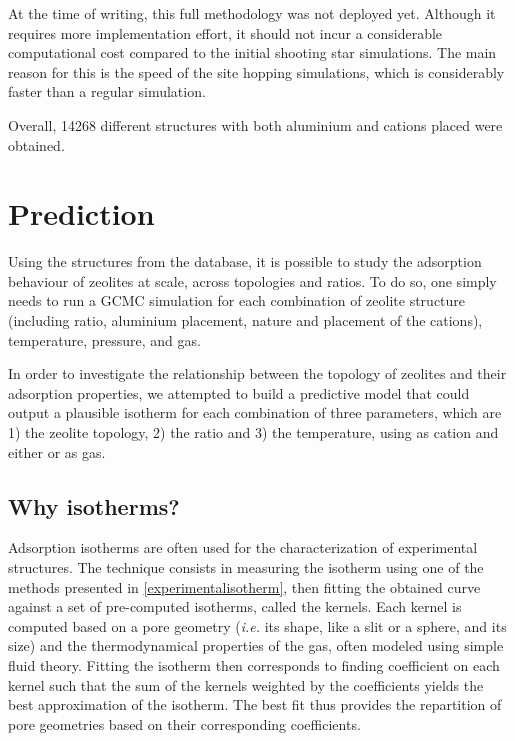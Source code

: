\documentclass[main.tex]{subfiles}
\begin{document}
At the time of writing, this full methodology was not deployed yet. Although it requires more implementation effort, it should not incur a considerable computational cost compared to the initial shooting star simulations. The main reason for this is the speed of the site hopping simulations, which is considerably faster than a regular simulation.

Overall, \num{14268} different structures with both aluminium and cations placed were obtained.


\section{Prediction}

Using the structures from the database, it is possible to study the adsorption behaviour of zeolites at scale, across topologies and \SiAl ratios. To do so, one simply needs to run a GCMC simulation for each combination of zeolite structure (including \SiAl ratio, aluminium placement, nature and placement of the cations), temperature, pressure, and gas.

In order to investigate the relationship between the topology of zeolites and their adsorption properties, we attempted to build a predictive model that could output a plausible isotherm for each combination of three parameters, which are 1) the zeolite topology, 2) the \SiAl ratio and 3) the temperature, using  as cation and either  or  as gas.

\subsection{Why isotherms?}

Adsorption isotherms are often used for the characterization of experimental structures. The technique consists in measuring the isotherm using one of the methods presented in \cref{experimentalisotherm}, then fitting the obtained curve against a set of pre-computed isotherms, called the kernels. Each kernel is computed based on a pore geometry (\textit{i.e.} its shape, like a slit or a sphere, and its size) and the thermodynamical properties of the gas, often modeled using simple fluid theory. Fitting the isotherm then corresponds to finding coefficient on each kernel such that the sum of the kernels weighted by the coefficients yields the best approximation of the isotherm. The best fit thus provides the repartition of pore geometries based on their corresponding coefficients.
\end{document}
